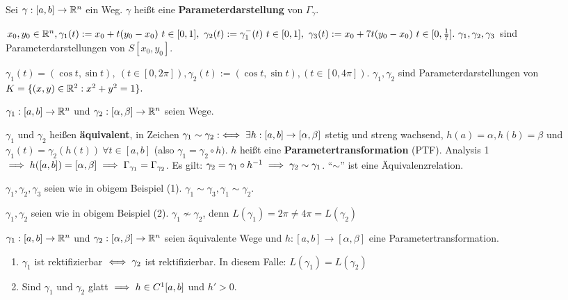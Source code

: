 \documentclass[a4paper,oneside,DIV15,BCOR12mm,chapterprefix=true,headings=onelinechapter]{scrbook}
\begin{document}
\begin{definition*}
Sei $\gamma:[a,b]\to\mathbb{R}^n$ ein Weg. $\gamma$ heißt eine \textbf{Parameterdarstellung} von $\Gamma_\gamma$.
\end{definition*}

\begin{beispiele}
\item $x_0, y_0\in\MdR^n, \gamma_1(t):=x_0+t(y_0-x_0)\ t\in[0,1],\ \gamma_2(t):=\gamma_1^-(t)\ t\in[0,1],\ \gamma_3(t):=x_0+7t(y_0-x_0)\ t\in[0,\frac{1}{7}].\ \gamma_1,\gamma_2,\gamma_3$ sind Parameterdarstellungen von $S[x_0, y_0]$.
\item $\gamma_1(t)=(\cos t, \sin t),\ (t\in [0,2\pi]), \gamma_2(t):=(\cos t, \sin t), (t\in[0,4\pi])$. $\gamma_1, \gamma_2$ sind Parameterdarstellungen von $K=\{(x,y)\in\mathbb{R}^2: x^2+y^2=1\}.$
\end{beispiele}

\begin{definition*}
$\gamma_1:[a,b]\to\mathbb{R}^n$ und $\gamma_2:[\alpha,\beta]\to\mathbb{R}^n$ seien Wege.

$\gamma_1$ und $\gamma_2$ heißen \textbf{äquivalent}, in Zeichen $\gamma_1\sim\gamma_2:\iff\exists h:[a,b]\to[\alpha, \beta]$ stetig und streng wachsend, $h(a)=\alpha, h(b)=\beta$ und $\gamma_1(t)=\gamma_2(h(t))\ \forall t\in[a,b]$ (also $\gamma_1=\gamma_2\circ h)$. $h$ heißt eine \textbf{Parametertransformation} (PTF). Analysis 1 $\implies h([a,b])=[\alpha,\beta]\implies \Gamma_{\gamma_1}=\Gamma_{\gamma_2}$.
Es gilt: $\gamma_2=\gamma_1\circ h^{-1}\implies \gamma_2\sim\gamma_1$. "`$\sim$"' ist eine Äquivalenzrelation.
\end{definition*}

\begin{beispiele}
\item $\gamma_1, \gamma_2, \gamma_3$ seien wie in obigem Beispiel (1). $\gamma_1\sim\gamma_3, \gamma_1\sim\gamma_2$.
\item $\gamma_1, \gamma_2$ seien wie in obigem Beispiel (2). $\gamma_1\nsim\gamma_2$, denn $L(\gamma_1)=2\pi\ne 4\pi=L(\gamma_2)$
\end{beispiele}

\begin{satz}
$\gamma_1:[a,b]\to\mathbb{R}^n$ und $\gamma_2:[\alpha,\beta]\to\mathbb{R}^n$ seien äquivalente Wege und $h:[a,b]\to[\alpha,\beta]$ eine Parametertransformation.
\begin{enumerate}
\item $\gamma_1$ ist rektifizierbar $\iff \gamma_2$ ist rektifizierbar. In diesem Falle: $L(\gamma_1)=L(\gamma_2)$
\item Sind $\gamma_1$ und $\gamma_2$ glatt $\implies h\in C^1[a,b]$ und $h'>0$.
\end{enumerate}
\end{satz}
\end{document}
